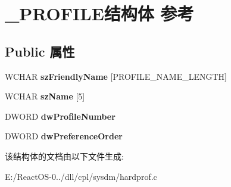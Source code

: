 \hypertarget{struct___p_r_o_f_i_l_e}{}\section{\+\_\+\+P\+R\+O\+F\+I\+L\+E结构体 参考}
\label{struct___p_r_o_f_i_l_e}
\subsection*{Public 属性}
\begin{DoxyCompactItemize}
\item 
\mbox{\label{struct___p_r_o_f_i_l_e_ab2b88d375def5ade4a50f24494db4268}} 
W\+C\+H\+AR {\bfseries sz\+Friendly\+Name} \mbox{[}P\+R\+O\+F\+I\+L\+E\+\_\+\+N\+A\+M\+E\+\_\+\+L\+E\+N\+G\+TH\mbox{]}
\item 
\mbox{\label{struct___p_r_o_f_i_l_e_a098f45a6443469ef37e021a350c182b0}} 
W\+C\+H\+AR {\bfseries sz\+Name} \mbox{[}5\mbox{]}
\item 
\mbox{\label{struct___p_r_o_f_i_l_e_a4c5af927a950607e7b836d96d35e51f9}} 
D\+W\+O\+RD {\bfseries dw\+Profile\+Number}
\item 
\mbox{\label{struct___p_r_o_f_i_l_e_aa9f1dda3807b561cbb549841004c9793}} 
D\+W\+O\+RD {\bfseries dw\+Preference\+Order}
\end{DoxyCompactItemize}


该结构体的文档由以下文件生成\+:\begin{DoxyCompactItemize}
\item 
E\+:/\+React\+O\+S-\/0../dll/cpl/sysdm/hardprof.\+c\end{DoxyCompactItemize}
